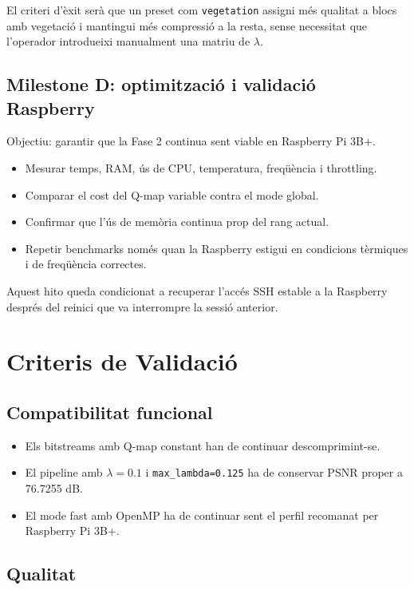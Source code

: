 \documentclass[11pt,a4paper]{article}
\begin{document}
El criteri d'èxit serà que un preset com \texttt{vegetation} assigni més qualitat a blocs amb vegetació i mantingui més compressió a la resta, sense necessitat que l'operador introdueixi manualment una matriu de $\lambda$.

\subsection{Milestone D: optimització i validació Raspberry}

Objectiu: garantir que la Fase 2 continua sent viable en Raspberry Pi 3B+.

\begin{itemize}
  \item Mesurar temps, RAM, ús de CPU, temperatura, freqüència i throttling.
  \item Comparar el cost del Q-map variable contra el mode global.
  \item Confirmar que l'ús de memòria continua prop del rang actual.
  \item Repetir benchmarks només quan la Raspberry estigui en condicions tèrmiques i de freqüència correctes.
\end{itemize}

Aquest hito queda condicionat a recuperar l'accés SSH estable a la Raspberry després del reinici que va interrompre la sessió anterior.

\section{Criteris de Validació}

\subsection{Compatibilitat funcional}

\begin{itemize}
  \item Els bitstreams amb Q-map constant han de continuar descomprimint-se.
  \item El pipeline amb $\lambda=0.1$ i \texttt{max\_lambda=0.125} ha de conservar PSNR proper a 76.7255 dB.
  \item El mode fast amb OpenMP ha de continuar sent el perfil recomanat per Raspberry Pi 3B+.
\end{itemize}

\subsection{Qualitat}
\end{document}
